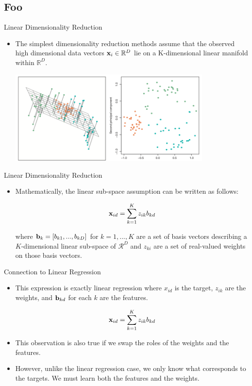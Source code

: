 \documentclass[serif,xcolor=pdftex,dvipsnames,table,hyperref={bookmarks=false,breaklinks}]{beamer}
\begin{document}
\subsection{Foo}

\begin{frame}[t]{Linear Dimensionality Reduction}
 
\begin{itemize}
\item The simplest dimensionality reduction methods assume that the observed 
high dimensional data vectors ${\mathbf{x}}_i\in \mathbb{R}^D$ lie on a 
K-dimensional linear manifold within $\mathbb{R}^D$. 

\center
\includegraphics[width=4in]{../Figures/linear_subspace.png}


\end{itemize} 
\end{frame}

\begin{frame}[t]{Linear Dimensionality Reduction}
 
\begin{itemize}
\item Mathematically, the linear sub-space assumption can be written as follows:

{\Large
$${\mathbf{x}}_{id} = \sum_{k=1}^K z_{ik} b_{kd}$$
}

where ${\mathbf{b}}_k=[b_{k1},...,b_{kD}]$ for $k=1,...,K$ are a 
set of basis vectors describing a $K$-dimensional linear sub-space of 
$\mathcal{R}^{D}$ and $z_{ki}$ are a set of real-valued weights on those basis 
vectors.


\end{itemize} 
\end{frame}


\begin{frame}[t]{Connection to Linear Regression}
 
\begin{itemize}
\item This expression is exactly linear regression where $x_{id}$ is 
the target, $z_{ik}$ are the weights, and ${\mathbf{b}}_{kd}$ for each $k$ are the 
features. 

{\Large
$${\mathbf{x}}_{id} = \sum_{k=1}^K z_{ik} b_{kd}$$
}

\pause\item This observation is also true if we swap the roles of the weights 
and the features.

\pause\item However, unlike the linear regression case, we only know what 
corresponds to the targets. We must learn both the features and the weights. 

\end{itemize} 
\end{frame}
\end{document}
